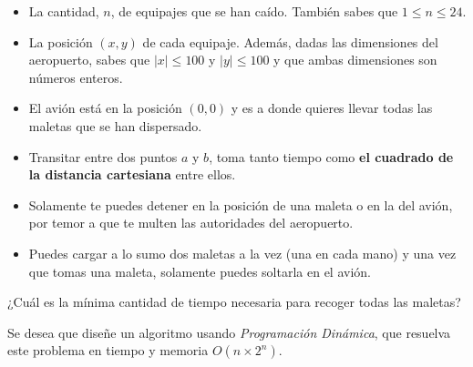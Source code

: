 \documentclass[letterpaper, 12pt]{article}
\begin{document}
\begin{enumerate}
\begin{itemize}
    \item La cantidad, $n$, de equipajes que se han caído. También sabes que $1 \leq n \leq 24$.

    \item La posición $(x, y)$ de cada equipaje. Además, dadas las dimensiones del aeropuerto, sabes que $|x| \leq 100$ y $|y| \leq 100$ y que ambas dimensiones son números enteros.
    \item El avión está en la posición $(0, 0)$ y es a donde quieres llevar todas las maletas que se han dispersado.
    \item Transitar entre dos puntos $a$ y $b$, toma tanto tiempo como \textbf{el cuadrado de la distancia cartesiana} entre ellos.
    \item Solamente te puedes detener en la posición de una maleta o en la del avión, por temor a que te multen las autoridades del aeropuerto.
    \item Puedes cargar a lo sumo dos maletas a la vez (una en cada mano) y una vez que tomas una maleta, solamente puedes soltarla en el avión.
\end{itemize}

¿Cuál es la mínima cantidad de tiempo necesaria para recoger todas las maletas?

Se desea que diseñe un algoritmo usando \emph{Programación Dinámica}, que resuelva este problema en tiempo y memoria $O(n \times 2^n)$.

%
%

%
%
%

%
%
%
%


\end{enumerate} \vspace{4mm}
\end{document}
